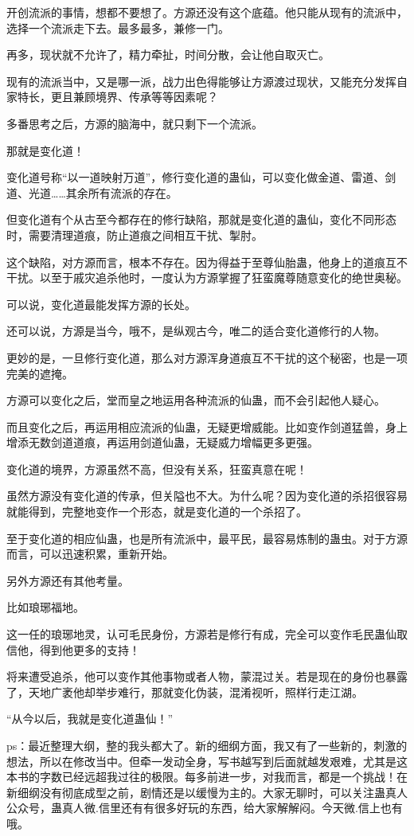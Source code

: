 \begin{this_body}
开创流派的事情，想都不要想了。方源还没有这个底蕴。他只能从现有的流派中，选择一个流派走下去。最多最多，兼修一门。

再多，现状就不允许了，精力牵扯，时间分散，会让他自取灭亡。

现有的流派当中，又是哪一派，战力出色得能够让方源渡过现状，又能充分发挥自家特长，更且兼顾境界、传承等等因素呢？

多番思考之后，方源的脑海中，就只剩下一个流派。

那就是变化道！

变化道号称“以一道映射万道”，修行变化道的蛊仙，可以变化做金道、雷道、剑道、光道……其余所有流派的存在。

但变化道有个从古至今都存在的修行缺陷，那就是变化道的蛊仙，变化不同形态时，需要清理道痕，防止道痕之间相互干扰、掣肘。

这个缺陷，对方源而言，根本不存在。因为得益于至尊仙胎蛊，他身上的道痕互不干扰。以至于戚灾追杀他时，一度认为方源掌握了狂蛮魔尊随意变化的绝世奥秘。

可以说，变化道最能发挥方源的长处。

还可以说，方源是当今，哦不，是纵观古今，唯二的适合变化道修行的人物。

更妙的是，一旦修行变化道，那么对方源浑身道痕互不干扰的这个秘密，也是一项完美的遮掩。

方源可以变化之后，堂而皇之地运用各种流派的仙蛊，而不会引起他人疑心。

而且变化之后，再运用相应流派的仙蛊，无疑更增威能。比如变作剑道猛兽，身上增添无数剑道道痕，再运用剑道仙蛊，无疑威力增幅更多更强。

变化道的境界，方源虽然不高，但没有关系，狂蛮真意在呢！

虽然方源没有变化道的传承，但关隘也不大。为什么呢？因为变化道的杀招很容易就能得到，完整地变作一个形态，就是变化道的一个杀招了。

至于变化道的相应仙蛊，也是所有流派中，最平民，最容易炼制的蛊虫。对于方源而言，可以迅速积累，重新开始。

另外方源还有其他考量。

比如琅琊福地。

这一任的琅琊地灵，认可毛民身份，方源若是修行有成，完全可以变作毛民蛊仙取信他，得到他更多的支持！

将来遭受追杀，他可以变作其他事物或者人物，蒙混过关。若是现在的身份也暴露了，天地广袤他却举步难行，那就变化伪装，混淆视听，照样行走江湖。

“从今以后，我就是变化道蛊仙！”

ps：最近整理大纲，整的我头都大了。新的细纲方面，我又有了一些新的，刺激的想法，所以在修改当中。但牵一发动全身，写书越写到后面就越发艰难，尤其是这本书的字数已经远超我过往的极限。每多前进一步，对我而言，都是一个挑战！在新细纲没有彻底成型之前，剧情还是以缓慢为主的。大家无聊时，可以关注蛊真人公众号，蛊真人微.信里还有有很多好玩的东西，给大家解解闷。今天微.信上也有哦。

\end{this_body}


